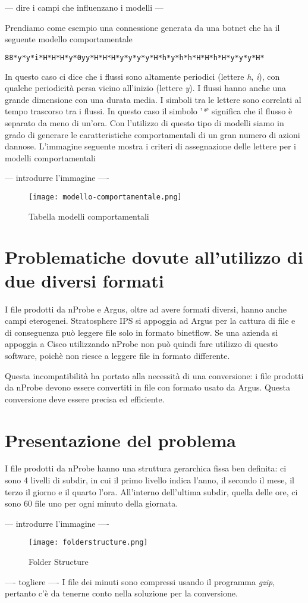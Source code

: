 \documentclass[../main.tex]{subfiles}
\begin{document}
--- dire i campi che influenzano i modelli ---

Prendiamo come esempio una connessione generata da una botnet che ha il seguente modello comportamentale
\begin{lstlisting}[language=bash]
88*y*y*i*H*H*H*y*0yy*H*H*H*y*y*y*y*H*h*y*h*h*H*H*h*H*y*y*y*H*
\end{lstlisting}

In questo caso ci dice che i flussi sono altamente periodici (lettere \textit{h}, \textit{i}), con qualche periodicità persa vicino all'inizio (lettere \textit{y}). I flussi hanno anche una grande dimensione con una durata media. I simboli tra le lettere sono correlati al tempo trascorso tra i flussi. In questo caso il simbolo '\textit{*}' significa che il flusso è separato da meno di un'ora.
Con l'utilizzo di questo tipo di modelli siamo in grado di generare le caratteristiche comportamentali di un gran numero di azioni dannose. L'immagine seguente mostra i criteri di assegnazione delle lettere per i modelli comportamentali \newline

--- introdurre l'immagine ----
\begin{figure}[H]
\centering
\texttt{[image: modello-comportamentale.png]}
				\caption{Tabella modelli comportamentali}
\end{figure}

\section{Problematiche dovute all'utilizzo di due diversi formati}
I file prodotti da nProbe e Argus, oltre ad avere formati diversi, hanno anche campi eterogenei. Stratosphere IPS si appoggia ad Argus per la cattura di file e di conseguenza può leggere file solo in formato binetflow. 
Se una azienda si appoggia a Cisco utilizzando nProbe non può quindi fare utilizzo di questo software, poichè non riesce a leggere file in formato differente.

Questa incompatibilità ha portato alla necessità di una conversione: i file prodotti da nProbe devono essere convertiti in file con formato usato da Argus. Questa conversione deve essere precisa ed efficiente.

\section{Presentazione del problema}
I file prodotti da nProbe hanno una struttura gerarchica fissa ben definita: ci sono 4 livelli di subdir, in cui il primo livello indica l'anno, il secondo il mese, il terzo il giorno e il quarto l'ora. All'interno dell'ultima subdir, quella delle ore, ci sono 60 file uno per ogni minuto della giornata.

--- introdurre l'immagine ----
\begin{figure}[H]
\centering
\texttt{[image: folderstructure.png]}
\caption{Folder Structure}
\end{figure}

---- togliere ----
I file dei minuti sono compressi usando il programma \textit{gzip}, pertanto c'è da tenerne conto nella soluzione per la conversione.
\end{document}
